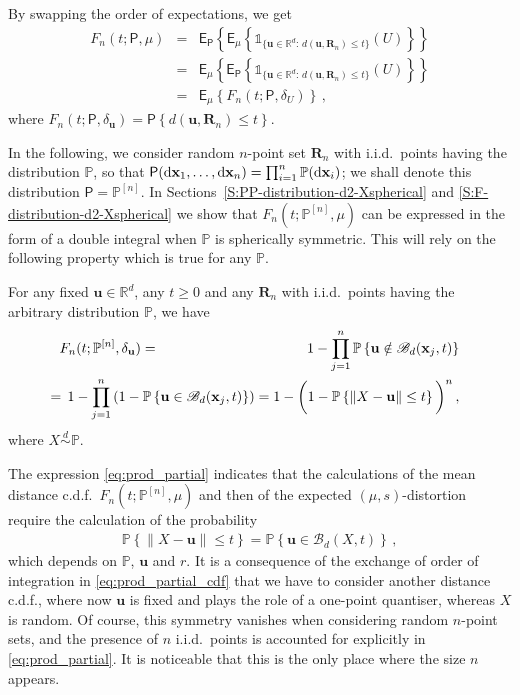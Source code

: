\documentclass{article}
\def\Px{\mathsf{P}}
\def\RR{\mathds{R}}
\def\xb{\mathbf{x}}
\def\Ex{\mathsf{E}}
\def\simd{\stackrel{d}{\sim}}
\def\PP{\mathbb{P}}
\def\SB{{\mathscr B}}
\newcommand{\bea}{\begin{eqnarray*}}
\newcommand{\eea}{\end{eqnarray*}}
\newcommand{\be}{\begin{eqnarray}}
\newcommand{\ee}{\end{eqnarray}}
\def\Rb{\mathbf{R}}
\def\ub{\mathbf{u}}
\def\dd{\mbox{\rm d}}
\def\Ind{\mathds{1}}
\begin{document}
By swapping the order of expectations, we get
\be
F_n(t; \Px,\mu)  &=& \Ex_\Px \left\{\Ex_\mu \left\{\Ind_{\{\ub\in\RR^d:\,d(\ub,\Rb_n)\leq t\}}(U) \right\}\right\} \nonumber \\
&=&  \Ex_\mu \left\{\Ex_\Px\left\{\Ind_{\{\ub\in\RR^d:\,d(\ub,\Rb_n)\leq t\}}(U) \right\}\right\} \nonumber \\
&=& \label{eq:prod_partial_cdf} \Ex_\mu  \left\{ F_n(t; \Px,\delta_U) \right\}\,,
\ee
where $F_n(t; \Px,\delta_\ub) = \Px  \left\{ d(\ub,\Rb_n)\leq t  \right\}$.

In the following, we consider random $n$-point set $\Rb_n$ with i.i.d.\ points having the distribution $\mathbb{P}$, so that $\Px(\dd\xb_1,\ldots,\dd\xb_n)=\prod_{i=1}^n \PP(\dd\xb_i)$; we shall denote this distribution $\Px=\PP^{[n]}$.
In Sections~\ref{S:PP-distribution-d2-Xspherical} and \ref{S:F-distribution-d2-Xspherical} we show that $F_n(t; \PP^{[n]},\mu)$ can be expressed in the form of a double integral when $\PP$ is spherically symmetric. This will rely on the following property which is true for any $\PP$.

For any fixed $\ub  \in \RR^d$, any $t \geq 0$ and any $\Rb_n$ with i.i.d.\ points having the arbitrary distribution $\PP$, we have
\be
F_n(t; \PP^{[n]},\delta_\ub) &=& 1-\prod_{j=1}^n \PP\left\{ \ub  \notin \SB_d({\xb}_j,t)  \right\} \nonumber \\
&& \hspace{-3cm} = \, 1-\prod_{j=1}^n\left(1- \PP  \left\{ \ub  \in \SB_d({\xb}_j,t)  \right\} \right) = 1-\bigg(1-\PP \left\{ \|X - \ub\| \leq t \right\} \bigg)^n\,,
\label{eq:prod_partial}
\ee
where $X \simd \PP$.

The expression \eqref{eq:prod_partial} indicates that the calculations of the mean distance c.d.f.\ $F_n(t; \PP^{[n]},\mu)$
and then of the expected $(\mu,s)$-distortion require the calculation of the probability
\bea %
\PP \left\{ \|X - \ub\| \leq t \right\} = \PP \left\{\ub    \in \SB_d(X,t)  \right\}\,,
\eea
which depends on $\PP$, $\ub $ and $r$. It is a consequence of the exchange of order of integration in \eqref{eq:prod_partial_cdf} that we have to consider another distance c.d.f., where now $\ub$ is fixed and plays the role of a one-point quantiser, whereas $X$ is random. Of course, this symmetry vanishes when considering random $n$-point sets, and the presence of $n$ i.i.d.\ points is accounted for explicitly in \eqref{eq:prod_partial}.
It is noticeable that this is the only place where the size $n$ appears.
\end{document}
